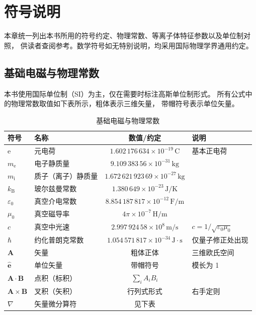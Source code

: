 \documentclass[12pt,a4paper,openany,oneside]{book}
\newcommand{\ii}{\mathrm{i}}
\newcommand{\ee}{\mathrm{e}}
\newcommand{\eps}{\varepsilon}
\newcommand{\vect}[1]{\bm{#1}}
\newcommand{\unitvec}[1]{\hat{\vect{#1}}}
\begin{document}
\clearpage
\tableofcontents

\chapter*{符号说明}

本章统一列出本书所用的符号约定、物理常数、等离子体特征参数以及单位制对照，
供读者查阅参考。数学符号如无特别说明，均采用国际物理学界通用约定。


\section*{基础电磁与物理常数}

本书使用国际单位制（SI）为主，仅在需要时标注高斯单位制形式。
所有公式中的物理常数取值如下表所示，粗体表示三维矢量，
带帽符号表示单位矢量。

\begin{table}[htbp]
\centering
\caption{基础电磁与物理常数}
\small
\begin{tabular}{@{}llcl@{}}
\toprule
\textbf{符号} & \textbf{名称} & \textbf{数值/约定} & \textbf{说明} \\
\midrule
$\ee$ & 元电荷 & $1.602\,176\,634\times 10^{-19}\,\mathrm{C}$ & 基本正电荷 \\
$m_\ee$ & 电子静质量 & $9.109\,383\,56\times 10^{-31}\,\mathrm{kg}$ & \\
$m_\ii$ & 质子（离子）静质量 & $1.672\,621\,923\,69\times 10^{-27}\,\mathrm{kg}$ & \\
$k_\mathrm{B}$ & 玻尔兹曼常数 & $1.380\,649\times 10^{-23}\,\mathrm{J/K}$ & \\
$\eps_0$ & 真空介电常数 & $8.854\,187\,817\times 10^{-12}\,\mathrm{F/m}$ & \\
$\mu_0$ & 真空磁导率 & $4\pi\times 10^{-7}\,\mathrm{H/m}$ & \\
$c$ & 真空中光速 & $2.997\,924\,58\times 10^{8}\,\mathrm{m/s}$ & $c=1/\sqrt{\eps_0\mu_0}$ \\
$\hbar$ & 约化普朗克常数 & $1.054\,571\,817\times 10^{-34}\,\mathrm{J\cdot s}$ & 仅量子修正处出现 \\
\midrule
$\vect{A}$ & 矢量 & 粗体正体 & 三维欧氏空间 \\
$\unitvec{e}$ & 单位矢量 & 带帽符号 & 模长为 1 \\
$\vect{A}\cdot\vect{B}$ & 点积（标积） & $\sum_i A_i B_i$ & \\
$\vect{A}\times\vect{B}$ & 叉积（矢积） & 行列式形式 & 右手定则 \\
$\nabla$ & 矢量微分算符 & 见下表 & \\
\bottomrule
\end{tabular}
\end{table}
\end{document}

